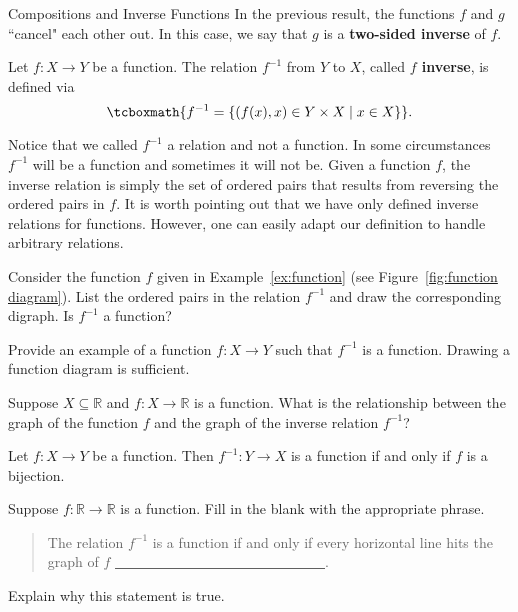 \begin{section}{Compositions and Inverse Functions}
In the previous result, the functions $f$ and $g$ ``cancel" each other out. In this case, we say that $g$ is a \textbf{two-sided inverse} of $f$.

\begin{definition}\label{def:inverse of a function}
Let $f:X\to Y$ be a function.  The relation $f^{-1}$ from $Y$ to $X$, called \textbf{$f$ inverse}, is defined via
\[
\tcboxmath{f^{-1}=\{(f(x),x)\in Y\times X\mid x\in X\}}.
\] 
\end{definition}

Notice that we called $f^{-1}$ a relation and not a function.  In some circumstances $f^{-1}$ will be a function and sometimes it will not be. Given a function $f$, the inverse relation is simply the set of ordered pairs that results from reversing the ordered pairs in $f$.  It is worth pointing out that we have only defined inverse relations for functions.  However, one can easily adapt our definition to handle arbitrary relations.

\begin{problem}
Consider the function $f$ given in Example~\ref{ex:function} (see Figure~\ref{fig:function diagram}). List the ordered pairs in the relation $f^{-1}$ and draw the corresponding digraph. Is $f^{-1}$ a function?
\end{problem}


\begin{problem}
Provide an example of a function $f:X\to Y$ such that $f^{-1}$ is a function. Drawing a function diagram is sufficient.
\end{problem}

\begin{problem}
Suppose $X\subseteq \mathbb{R}$ and $f:X\to \mathbb{R}$ is a function. What is the relationship between the graph of the function $f$ and the graph of the inverse relation $f^{-1}$?
\end{problem}

\begin{theorem}\label{thm:inverse function iff bijection}
Let $f:X\to Y$ be a function.  Then $f^{-1}:Y\to X$ is a function if and only if $f$ is a bijection.
\end{theorem}

\begin{problem}
Suppose $f:\mathbb{R}\to \mathbb{R}$ is a function. Fill in the blank with the appropriate phrase.
\begin{quote}
The relation $f^{-1}$ is a function if and only if every horizontal line hits the graph of $f$ \underline{\ \ \ \ \ \ \ \  \ \ \ \ \ \ \ \ \ \ \ \ \ \ \ \ \ \ \ \ \ \ }.%
\end{quote}
Explain why this statement is true.
\end{problem}


\end{section}
